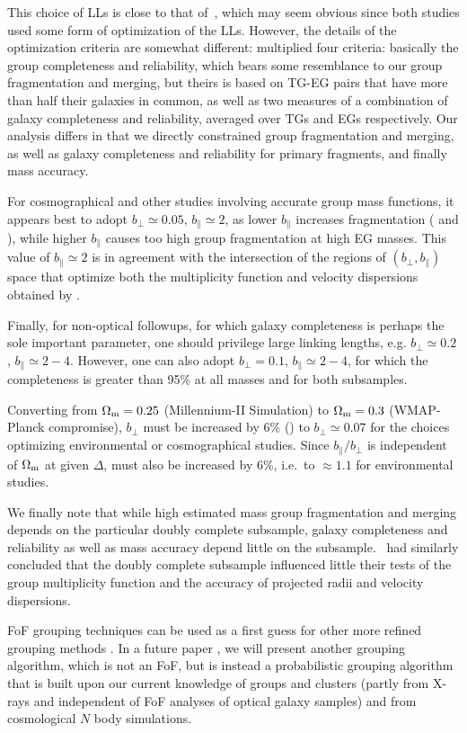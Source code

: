 This choice of LLs is close to that of~\cite{Robotham+11}, which may seem
obvious since both studies used some form of optimization of the LLs. However,
the details of the optimization criteria are somewhat different:
\citeauthor{Robotham+11} multiplied four criteria: basically the group
completeness and reliability, which bears some resemblance to our group
fragmentation and merging, but theirs is based on TG-EG pairs that have more
than half their galaxies in common, as well as two measures of a combination of
galaxy completeness and reliability, averaged over TGs and EGs respectively.
Our analysis differs in that we directly constrained group fragmentation and
merging, as well as galaxy completeness and reliability for primary fragments,
and finally mass accuracy.

For cosmographical and other studies involving accurate group mass functions,
it appears best to adopt $b_\perp \simeq 0.05$, $b_\parallel \simeq 2$, as
lower $b_\parallel$ increases fragmentation
( and ),
while higher $b_\parallel$ causes too high group fragmentation at high EG
masses. This value of $b_\parallel\simeq 2$ is in agreement with the
intersection of the regions of $(b_\perp,b_\parallel)$ space  that optimize
both the multiplicity function  and velocity dispersions obtained by
\cite{Berlind+06}.

Finally, for non-optical followups, for which galaxy completeness is perhaps
the sole important parameter, one should privilege large linking lengths, e.g.
$b_\perp \simeq 0.2$, $b_\parallel \simeq 2-4$. However, one can also adopt
$b_\perp = 0.1$, $b_\parallel \simeq 2-4$, for which the completeness is
greater than 95\% at all masses and for both subsamples.

Converting from $\Omega_{\rm m} = 0.25$ (Millennium-II Simulation) to
$\Omega_{\rm m} = 0.3$ (WMAP-Planck compromise), $b_\perp$ must be increased by
6\% () to $b_\perp \simeq 0.07$ for the choices
optimizing environmental or cosmographical studies. Since $b_\parallel/b_\perp$
is independent of $\Omega_{\rm m}$ at given $\Delta$, \bpar{} must also be
increased by 6\%, i.e.\ to \bpar$\approx1.1$ for environmental studies.

We finally note that while high estimated mass group fragmentation  and merging
depends on the particular doubly complete subsample, galaxy completeness and
reliability as well as mass accuracy depend little on the
subsample.~\cite{Berlind+06} had similarly concluded that the doubly complete
subsample influenced little their tests of the group multiplicity function and
the accuracy of projected radii and velocity dispersions.

FoF grouping techniques can be used as a first guess for other more refined
grouping methods \citep{Yang+05,Yang+07}. In a future paper \citep{DM14b}, we
will present another grouping algorithm, which is not an FoF, but is instead a
probabilistic grouping algorithm that is built upon our current knowledge of
groups and clusters (partly from X-rays and independent of FoF analyses of
optical galaxy samples) and from cosmological $N$ body simulations.

